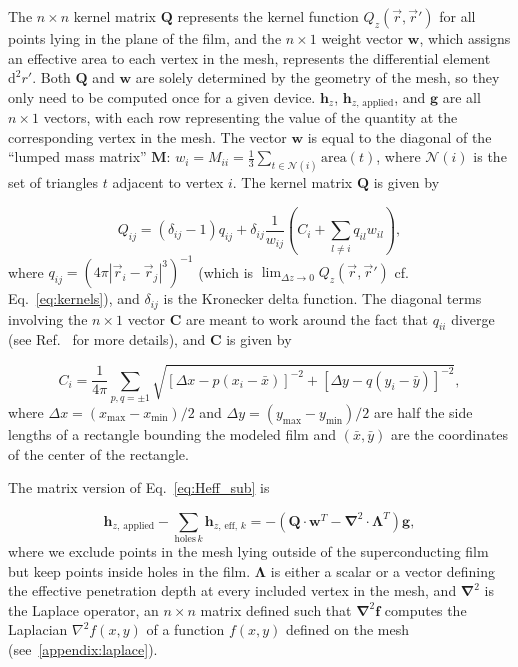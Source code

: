 \documentclass[final,3p,times]{elsarticle}
\newcounter{bla}
\begin{document}
The $n\times n$ kernel matrix $\mathbf{Q}$ represents the kernel function $Q_z(\vec{r},\vec{r}')$ for all points lying in the plane of the film, and the $n\times 1$ weight vector $\mathbf{w}$, which assigns an effective area to each vertex in the mesh, represents the differential element $\mathrm{d}^2r'$. Both $\mathbf{Q}$ and $\mathbf{w}$ are solely determined by the geometry of the mesh, so they only need to be computed once for a given device. $\mathbf{h}_z$, $\mathbf{h}_{z,\,\mathrm{applied}}$, and $\mathbf{g}$ are all $n\times 1$ vectors, with each row representing the value of the quantity at the
corresponding vertex in the mesh. The vector $\mathbf{w}$ is equal to the diagonal of the ``lumped mass matrix'' $\mathbf{M}$: $w_i=M_{ii} = \frac{1}{3}\sum_{t\in\mathcal{N}(i)}\mathrm{area}(t)$,
where $\mathcal{N}(i)$ is the set of triangles $t$ adjacent to vertex $i$. The kernel matrix $\mathbf{Q}$ is given by

\begin{equation}
    \label{eq:kernel_matrix}
    Q_{ij} = (\delta_{ij}-1)q_{ij}
    + \delta_{ij}\frac{1}{w_{ij}}\left(C_i + \sum_{l\neq i}q_{il}w_{il}\right),
\end{equation}
where $q_{ij} = \left(4\pi|\vec{r}_i-\vec{r}_j|^3\right)^{-1}$
(which is $\lim_{\Delta z\to 0}Q_z(\vec{r},\vec{r}')$ cf. Eq.~\ref{eq:kernels}),
and $\delta_{ij}$ is the Kronecker delta function. The diagonal terms involving the $n\times 1$ vector $\mathbf{C}$ are meant to work around the fact that $q_{ii}$ diverge (see Ref.~\cite{Brandt2005-wj} for more details), and $\mathbf{C}$ is given by

\begin{equation}
    \label{eq:C_vector}
    C_i = \frac{1}{4\pi}\sum_{p,q=\pm1}\sqrt{[\Delta x - p(x_i-\bar{x})]^{-2} + [\Delta y - q(y_i-\bar{y})]^{-2}},
\end{equation}
where $\Delta x=(x_\mathrm{max}-x_\mathrm{min})/2$ and $\Delta y=(y_\mathrm{max}-y_\mathrm{min})/2$ are half the side lengths of a rectangle bounding the modeled film and $(\bar{x}, \bar{y})$ are the coordinates of the center of the rectangle.

The matrix version of Eq.~\ref{eq:Heff_sub} is

\begin{equation}
    \label{eq:Heff_sub_num}
     \mathbf{h}_{z,\,\mathrm{applied}} - \sum_{\mathrm{holes}\, k}\mathbf{h}_{z,\,\mathrm{eff},\,k} = -(\mathbf{Q}\cdot\mathbf{w}^T-\mathbf{\nabla}^2\cdot \mathbf{\Lambda}^T)\mathbf{g},
\end{equation}
where we exclude points in the mesh lying outside of the superconducting film but keep points
inside holes in the film. $\mathbf{\Lambda}$ is either a scalar or a vector defining the effective penetration depth at every included vertex in the mesh, and $\mathbf{\nabla}^2$
is the Laplace operator, an $n\times n$ matrix defined such that $\mathbf{\nabla}^2\mathbf{f}$ computes the Laplacian $\nabla^2f(x,y)$ of a function $f(x,y)$ defined on the mesh  (see~\ref{appendix:laplace}).
\end{document}
